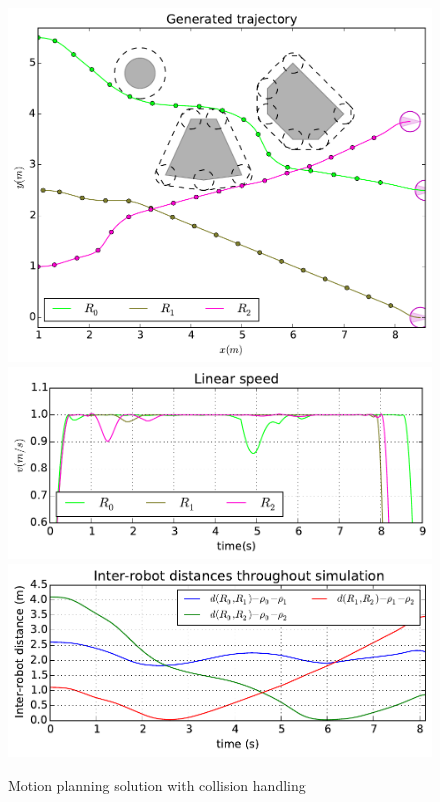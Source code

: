 \begin{figure}\centering
  \includegraphics[width=\linewidth]{./images/no_collision/new/multirobot-path.pdf} 
  \\[1mm]
  \includegraphics[width=\linewidth]{./images/no_collision/new/multirobot-vw.pdf} %
  \includegraphics[width=\linewidth]{./images/no_collision/new/multirobot-interr.pdf} %
  \caption{Motion planning solution with collision handling\label{fig:nocollision}}
\label{fig:res}
\end{figure}

